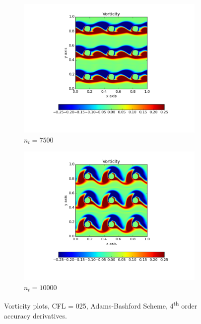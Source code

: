 \documentclass[10pt, a4paper]{article}
\begin{document}
\begin{figure}[htb!]
\begin{subfigure}{.5\textwidth}
  \includegraphics[width=1.1\linewidth, clip=true, trim=1cm 1cm 1cm 1cm]{q5_0003}
  \caption{$n_t = 7500$}
  \label{fig:sub1}
\end{subfigure}%
\begin{subfigure}{.5\textwidth}
  \centering
  \includegraphics[width=1.1\linewidth, clip=true, trim=1cm 1cm 1cm 1cm]{q5_0004}
  \caption{$n_t = 10000$}
  \label{fig:sub2}
\end{subfigure}
\caption{Vorticity plots, CFL = 025, Adams-Bashford Scheme, 4\textsuperscript{th} order accuracy derivatives.}
\label{fig:test}
\end{figure}

\end{document}
